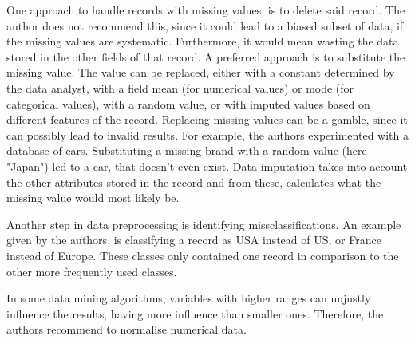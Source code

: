 One approach to handle records with missing values, is to delete said record. The author does not recommend this, since it could lead to a biased subset of data, if the missing values are systematic. Furthermore, it would mean wasting the data stored in the other fields of that record. A preferred approach is to substitute the missing value. The value can be replaced, either with a constant determined by the data analyst, with a field mean (for numerical values) or mode (for categorical values), with a random value, or with imputed values based on different features of the record. Replacing missing values can be a gamble, since it can possibly lead to invalid results. For example, the authors experimented with a database of cars. Substituting a missing brand with a random value (here "Japan") led to a car, that doesn't even exist. Data imputation takes into account the other attributes stored in the record and from these, calculates what the missing value would most likely be.

Another step in data preprocessing is identifying missclassifications. An example given by the authors, is classifying a record as USA instead of US, or France instead of Europe. These classes only contained one record in comparison to the other more frequently used classes.


In some data mining algorithms, variables with higher ranges can unjustly influence the results, having more influence than smaller ones. Therefore, the authors recommend to normalise numerical data. 

